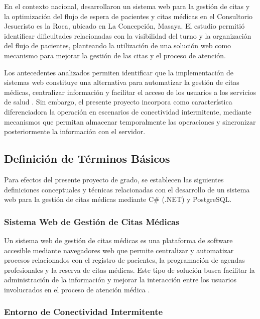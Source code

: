 En el contexto nacional, \textcite{siero2025} desarrollaron un sistema web para la gestión de citas y la optimización del flujo de espera de pacientes y citas médicas en el Consultorio Jesucristo es la Roca, ubicado en La Concepción, Masaya. El estudio permitió identificar dificultades relacionadas con la visibilidad del turno y la organización del flujo de pacientes, planteando la utilización de una solución web como mecanismo para mejorar la gestión de las citas y el proceso de atención.

Los antecedentes analizados permiten identificar que la implementación de sistemas web constituye una alternativa para automatizar la gestión de citas médicas, centralizar información y facilitar el acceso de los usuarios a los servicios de salud \parencite{diaz2019,herrera2021,nolasco2019,quispe2018,mera2022,valera2024,siero2025}. Sin embargo, el presente proyecto incorpora como característica diferenciadora la operación en escenarios de conectividad intermitente, mediante mecanismos que permitan almacenar temporalmente las operaciones y sincronizar posteriormente la información con el servidor.

\subsection{Definición de Términos Básicos}

Para efectos del presente proyecto de grado, se establecen las siguientes definiciones conceptuales y técnicas relacionadas con el desarrollo de un sistema web para la gestión de citas médicas mediante C\# (.NET) y PostgreSQL.

\subsubsection{Sistema Web de Gestión de Citas Médicas}

Un sistema web de gestión de citas médicas es una plataforma de software accesible mediante navegadores web que permite centralizar y automatizar procesos relacionados con el registro de pacientes, la programación de agendas profesionales y la reserva de citas médicas. Este tipo de solución busca facilitar la administración de la información y mejorar la interacción entre los usuarios involucrados en el proceso de atención médica \parencite{zhao2017,nolasco2019}.

\subsubsection{Entorno de Conectividad Intermitente}

